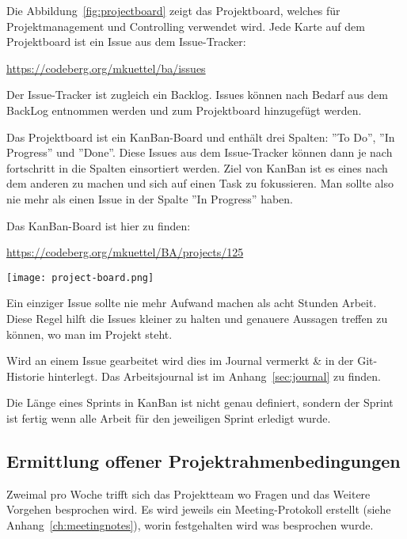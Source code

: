 Die Abbildung~\ref{fig:projectboard} zeigt das Projektboard, welches für Projektmanagement und Controlling verwendet wird.
Jede Karte auf dem Projektboard ist ein Issue aus dem Issue-Tracker:

\url{https://codeberg.org/mkuettel/ba/issues}

Der Issue-Tracker ist zugleich ein Backlog. Issues können nach Bedarf aus dem BackLog entnommen werden und zum Projektboard hinzugefügt werden.

Das Projektboard ist ein KanBan-Board und enthält drei Spalten: ''To Do'', ''In Progress'' und ''Done''.
Diese Issues aus dem Issue-Tracker können dann je nach fortschritt in die Spalten einsortiert werden. 
Ziel von KanBan ist es eines nach dem anderen zu machen und sich auf einen Task zu fokussieren. Man sollte also nie mehr als einen Issue in der Spalte ''In Progress'' haben.


Das KanBan-Board ist hier zu finden:

\url{https://codeberg.org/mkuettel/BA/projects/125}


\begin{figure*}[ht]
    \texttt{[image: project-board.png]}
    \caption{CodeBerg Project Board}
    \label{fig:projectboard}
\end{figure*}


Ein einziger Issue sollte nie mehr Aufwand machen als acht Stunden Arbeit. Diese Regel hilft die Issues kleiner zu halten und genauere Aussagen treffen zu können, wo man im Projekt steht.

Wird an einem Issue gearbeitet wird dies im Journal vermerkt \& in der Git-Historie hinterlegt.
Das Arbeitsjournal ist im Anhang~\ref{sec:journal} zu finden.


Die Länge eines Sprints in KanBan ist nicht genau definiert, sondern der Sprint ist fertig wenn alle Arbeit für den jeweiligen Sprint erledigt wurde.

\subsection{Ermittlung offener Projektrahmenbedingungen}
\label{sub:RequirementsEngineering}

Zweimal pro Woche trifft sich das Projektteam wo Fragen und das Weitere
Vorgehen besprochen wird. Es wird jeweils ein Meeting-Protokoll erstellt (siehe
Anhang~\ref{ch:meetingnotes}), worin festgehalten wird was besprochen wurde.

